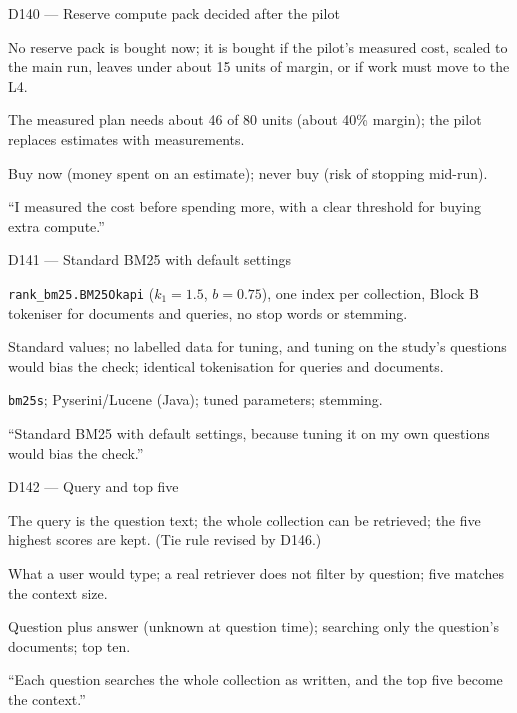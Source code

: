 \documentclass[11pt,a4paper]{report}
\begin{document}
\begin{decisionbox}{D140 --- Reserve compute pack decided after the pilot}
\begin{description}[nosep, leftmargin=0pt]
  \item[Decision.] No reserve pack is bought now; it is bought if the pilot's measured cost, scaled to the main run, leaves under about 15 units of margin, or if work must move to the L4.
  \item[Why.] The measured plan needs about 46 of 80 units (about 40\% margin); the pilot replaces estimates with measurements.
  \item[Alternatives.] Buy now (money spent on an estimate); never buy (risk of stopping mid-run).
  \item[Interview line.] ``I measured the cost before spending more, with a clear threshold for buying extra compute.''
\end{description}
\end{decisionbox}



\begin{decisionbox}{D141 --- Standard BM25 with default settings}
\begin{description}[nosep, leftmargin=0pt]
  \item[Decision.] \texttt{rank\_bm25.BM25Okapi} ($k_1 = 1.5$, $b = 0.75$), one index per collection, Block B tokeniser for documents and queries, no stop words or stemming.
  \item[Why.] Standard values; no labelled data for tuning, and tuning on the study's questions would bias the check; identical tokenisation for queries and documents.
  \item[Alternatives.] \texttt{bm25s}; Pyserini/Lucene (Java); tuned parameters; stemming.
  \item[Interview line.] ``Standard BM25 with default settings, because tuning it on my own questions would bias the check.''
\end{description}
\end{decisionbox}

\begin{decisionbox}{D142 --- Query and top five}
\begin{description}[nosep, leftmargin=0pt]
  \item[Decision.] The query is the question text; the whole collection can be retrieved; the five highest scores are kept. (Tie rule revised by D146.)
  \item[Why.] What a user would type; a real retriever does not filter by question; five matches the context size.
  \item[Alternatives.] Question plus answer (unknown at question time); searching only the question's documents; top ten.
  \item[Interview line.] ``Each question searches the whole collection as written, and the top five become the context.''
\end{description}
\end{decisionbox}
\end{document}
